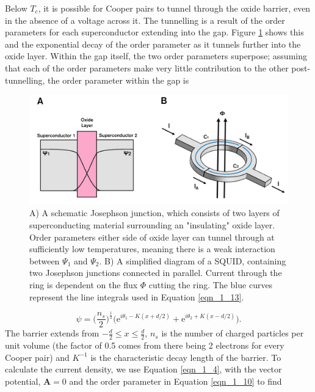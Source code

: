 Below $T_c$, it is possible for Cooper pairs to tunnel through the oxide barrier, even in the absence of a voltage across it. The tunnelling is a result of the order parameters for each superconductor extending into the gap. Figure \ref{fig_1_s1} shows this and the exponential decay of the order parameter as it tunnels further into the oxide layer. Within the gap itself, the two order parameters superpose; assuming that each of the order parameters make very little contribution to the other post-tunnelling, the order parameter within the gap is 

\begin{figure}[t!]
	\begin{center}
		\includegraphics[width=\linewidth]{./images/chapter1/figure_s1.png}\caption{A) A schematic Josephson junction, which consists of two layers of superconducting material surrounding an "insulating" oxide layer. Order parameters either side of oxide layer can tunnel through at sufficiently low temperatures, meaning there is a weak interaction between $\Psi_1$ and $\Psi_2$. B) A simplified diagram of a SQUID, containing two Josephson junctions connected in parallel. Current through the ring is dependent on the flux $\Phi$ cutting the ring. The blue curves represent the line integrals used in Equation \ref{eqn_1_13}.}\label{fig_1_s1}
	\end{center}
\end{figure}

\begin{equation}
\psi=\Bigg(\frac{n_s}{2}\Bigg)^{\frac{1}{2}}\Big(\text{e}^{i\theta_1-K(x+d/2)}+\text{e}^{i\theta_2+K(x-d/2)}\Big). \label{eqn_1_10}
\end{equation} The barrier extends from $-\frac{d}{2} \leq x \leq \frac{d}{2}$, $n_s$ is the number of charged particles per unit volume (the factor of 0.5 comes from there being 2 electrons for every Cooper pair) and $K^{-1}$ is the characteristic decay length of the barrier. To calculate the current density, we use Equation \ref{eqn_1_4}, with the vector potential, $\mathbf{A}=0$ and the order parameter in Equation \ref{eqn_1_10} to find

